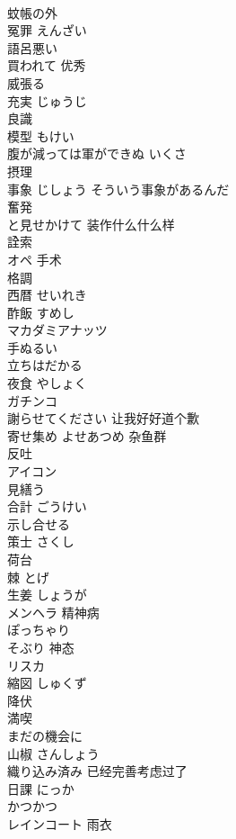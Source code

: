 \documentclass[8pt]{extreport}
\begin{document}
\begin{CJK}{UTF8}{min}
\\	蚊帳の外	
\\	冤罪	えんざい
\\	語呂悪い	
\\	買われて	优秀
\\	威張る	
\\	充実	じゅうじ
\\	良識	
\\	模型	もけい
\\	腹が減っては軍ができぬ	いくさ
\\	摂理	
\\	事象	じしょう そういう事象があるんだ
\\	奮発	
\\	と見せかけて	装作什么什么样
\\	詮索	
\\	オペ	手术
\\	格調	
\\	西暦	せいれき
\\	酢飯	すめし
\\	マカダミアナッツ	
\\	手ぬるい	
\\	立ちはだかる	
\\	夜食	やしょく
\\	ガチンコ	
\\	謝らせてください	让我好好道个歉
\\	寄せ集め	よせあつめ 杂鱼群
\\	反吐	
\\	アイコン	
\\	見繕う	
\\	合計	ごうけい
\\	示し合せる	
\\	策士	さくし
\\	荷台	
\\	棘	とげ
\\	生姜	しょうが
\\	メンヘラ	精神病
\\	ぽっちゃり	
\\	そぶり	神态
\\	リスカ	
\\	縮図	しゅくず
\\	降伏	
\\	満喫	
\\	まだの機会に	
\\	山椒	さんしょう
\\	織り込み済み	已经完善考虑过了
\\	日課	にっか
\\	かつかつ	
\\	レインコート	雨衣

\end{CJK}
\end{document}
